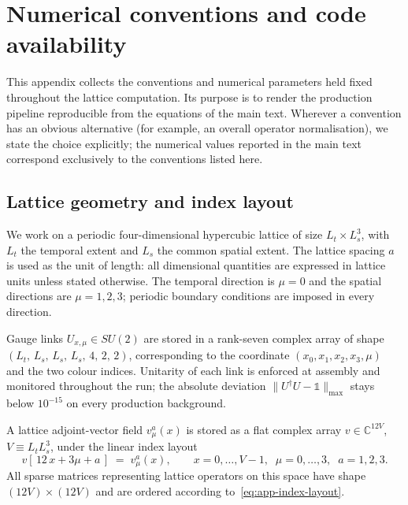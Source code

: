 \documentclass[a4paper,11pt]{article}
\theoremstyle{definition}
\begin{document}
\appendix

\section{Numerical conventions and code availability}
\label{app:conventions}

This appendix collects the conventions and numerical parameters held fixed
throughout the lattice computation. Its purpose is to render the production
pipeline reproducible from the equations of the main text. Wherever a
convention has an obvious alternative (for example, an overall operator
normalisation), we state the choice explicitly; the numerical values
reported in the main text correspond exclusively to the conventions listed
here.

\subsection{Lattice geometry and index layout}
\label{app:conv-geometry}

We work on a periodic four-dimensional hypercubic lattice of size
$L_t \times L_s^3$, with $L_t$ the temporal extent and $L_s$ the common
spatial extent. The lattice spacing $a$ is used as the unit of length: all
dimensional quantities are expressed in lattice units unless stated
otherwise. The temporal direction is $\mu = 0$ and the spatial directions
are $\mu = 1, 2, 3$; periodic boundary conditions are imposed in every
direction.

Gauge links $U_{x,\mu} \in SU(2)$ are stored in a rank-seven complex array
of shape $(L_t,\,L_s,\,L_s,\,L_s,\,4,\,2,\,2)$, corresponding to the
coordinate $(x_0,x_1,x_2,x_3,\mu)$ and the two colour indices. Unitarity of
each link is enforced at assembly and monitored throughout the run; the
absolute deviation $\|U^\dagger U - \mathbb{1}\|_{\max}$ stays below
$10^{-15}$ on every production background.

A lattice adjoint-vector field $v^a_\mu(x)$ is stored as a flat complex
array $v \in \mathbb{C}^{12 V}$, $V \equiv L_t L_s^3$, under the linear
index layout
\begin{equation}
v[\,12\,x + 3\mu + a\,] \;=\; v^a_\mu(x),
\qquad
x = 0,\dots,V-1,\;\;\mu = 0,\dots,3,\;\;a = 1,2,3.
\label{eq:app-index-layout}
\end{equation}
All sparse matrices representing lattice operators on this space have
shape $(12 V) \times (12 V)$ and are ordered according
to~\eqref{eq:app-index-layout}.
\end{document}
